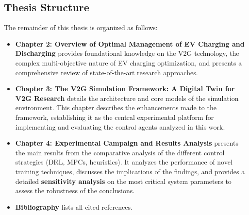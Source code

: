 \subsection{Thesis Structure}
The remainder of this thesis is organized as follows:
\begin{itemize}
    \item \textbf{Chapter 2: Overview of Optimal Management of EV Charging and Discharging} provides foundational knowledge on the V2G technology, the complex multi-objective nature of EV charging optimization, and presents a comprehensive review of state-of-the-art research approaches.

    \item \textbf{Chapter 3: The V2G Simulation Framework: A Digital Twin for V2G Research} details the architecture and core models of the simulation environment. This chapter describes the enhancements made to the framework, establishing it as the central experimental platform for implementing and evaluating the control agents analyzed in this work.

    \item \textbf{Chapter 4: Experimental Campaign and Results Analysis} presents the main results from the comparative analysis of the different control strategies (DRL, MPCs, heuristics). It analyzes the performance of novel training techniques, discusses the implications of the findings, and provides a detailed \textbf{sensitivity analysis} on the most critical system parameters to assess the robustness of the conclusions.

    \item \textbf{Bibliography} lists all cited references.
\end{itemize}